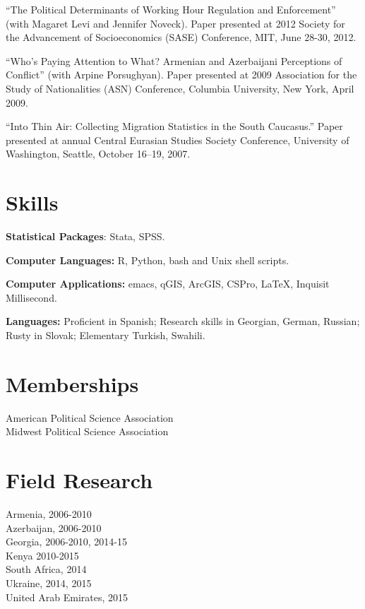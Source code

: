 \documentclass[margin,line]{res}
\begin{document}
{\begin{resume}
 ``The Political Determinants of Working Hour Regulation and Enforcement'' (with Magaret Levi and Jennifer Noveck). Paper presented at 2012 Society for the Advancement of
Socioeconomics (SASE) Conference, MIT, June 28-30, 2012.

``Who's Paying Attention to What? Armenian
 and Azerbaijani Perceptions of Conflict''  (with Arpine Porsughyan). Paper presented at 2009
 Association for the Study of Nationalities (ASN) Conference, Columbia
 University, New York, April 2009.

``Into Thin Air: Collecting Migration Statistics in the South
Caucasus.'' Paper presented at annual Central Eurasian Studies
Society Conference, University of Washington, Seattle, October 16--19, 2007.

\section{\sc Skills} 
\textbf{Statistical Packages}:  Stata, SPSS. \par\smallskip
\textbf{Computer Languages:} R, Python, bash and Unix shell scripts. \par\smallskip
\textbf{Computer Applications:} emacs, qGIS, ArcGIS, CSPro,  \LaTeX, Inquisit Millisecond.\par\smallskip
\textbf{Languages:} Proficient in Spanish; Research skills in
  Georgian, German, Russian; Rusty in Slovak; Elementary Turkish, Swahili.

\section{\sc Memberships}
American Political Science Association \\
Midwest Political Science Association

\section{\sc Field Research}
Armenia, 2006-2010  \\
Azerbaijan, 2006-2010\\
Georgia, 2006-2010, 2014-15 \\
Kenya 2010-2015 \\
South Africa, 2014 \\
Ukraine, 2014, 2015 \\
United Arab Emirates, 2015 \\


\end{resume}}
\end{document}
